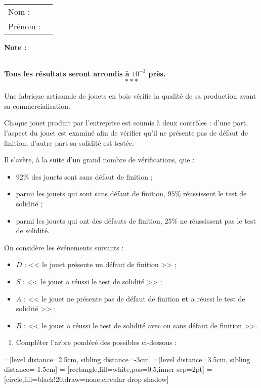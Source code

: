 \documentclass[10pt,french]{book}
\newcommand\competences{
\setcounter{exo}{0}
\begin{tabular}{ll} Nom : \\[5pt] Prénom : \end{tabular}
\hfill
\textbf{Note :}\renewcommand\arraystretch{2.3}
\begin{tabularx}{0.18\linewidth}{|X|}
\hline
\slashbox{\Huge\bfseries\phantom{10}}{\Huge\bfseries 10}\\
\hline
\end{tabularx}\renewcommand\arraystretch{1}\medskip
}
\begin{document}
\competences

\textbf{Tous les résultats seront arrondis à $10^{-3}$ près.}\[***\]

\exo Une fabrique artisanale de jouets en bois vérifie la qualité de sa production avant sa commercialisation.\par
Chaque jouet produit par l'entreprise est soumis à deux contrôles : d'une part, l'aspect du jouet est examiné afin de vérifier qu'il ne présente pas de défaut de finition, d'autre part sa solidité est testée.\par
Il s'avère, à la suite d'un grand nombre de vérifications, que :
\begin{itemize}
    \item $92\%$ des jouets sont sans défaut de finition ;
    \item parmi les jouets qui sont sans défaut de finition, $95\%$ réussissent le test de solidité ;
    \item parmi les jouets qui ont des défauts de finition, $25\%$ ne réussissent pas le test de solidité.
\end{itemize}\medskip

On considère les événements suivants :
\begin{itemize}
    \item $D$ : << le jouet présente un défaut de finition >> ;
    \item $S$ : << le jouet a réussi le test de solidité >> ;
    \item $A$ : << le jouet ne présente pas de défaut de finition \textbf{et} a réussi le test de solidité >> ;
    \item $B$ : << le jouet a réussi le test de solidité avec ou sans défaut de finition >>.
\end{itemize}\medskip

\begin{enumerate}
    \item Compléter l'arbre pondéré des possibles ci-dessous :
\end{enumerate}
    
=[level distance=2.5cm, sibling distance=-3cm]
=[level distance=3.5cm, sibling distance=-1.5cm]
 = [rectangle,fill=white,pos=0.5,inner sep=2pt]
 = [circle,fill=black!20,draw=none,circular drop shadow]
\end{document}
